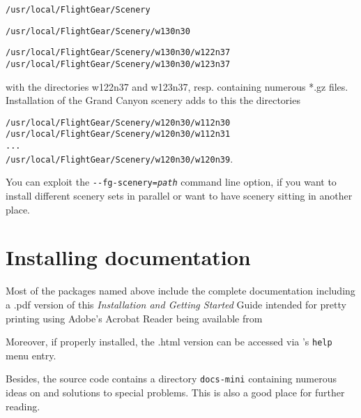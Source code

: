 \noindent
 \texttt{/usr/local/FlightGear/Scenery}

\noindent
 \texttt{/usr/local/FlightGear/Scenery/w130n30}

\noindent
 \texttt{/usr/local/FlightGear/Scenery/w130n30/w122n37}\\
 \texttt{/usr/local/FlightGear/Scenery/w130n30/w123n37}
 \medskip

\noindent 
 with the directories w122n37 and w123n37, resp. containing numerous *.gz
files. Installation of the Grand Canyon scenery adds to this the directories
\medskip

\noindent
 \texttt{/usr/local/FlightGear/Scenery/w120n30/w112n30}\\
 \texttt{/usr/local/FlightGear/Scenery/w120n30/w112n31}\\
 \texttt{...}\\
 \texttt{/usr/local/FlightGear/Scenery/w120n30/w120n39}.
 \medskip

You can exploit the \texttt{-$ $-fg-scenery={\it path}} command line option, if you want to install different scenery sets in parallel or want to have scenery sitting in another place.

\section{Installing documentation}

Most of the packages named above include the complete \FlightGear{} documentation
including a .pdf version of this \textit{Installation and Getting Started} Guide intended
for pretty printing using Adobe's Acrobat Reader being available from
 \medskip

 \medskip

 \noindent
 Moreover, if properly installed, the .html version can be accessed via
\FlightGear{}'s \texttt{help} menu entry.

Besides, the source code contains a directory \texttt{docs-mini} containing numerous
ideas on and solutions to special problems. This is also a good place for further
reading.

